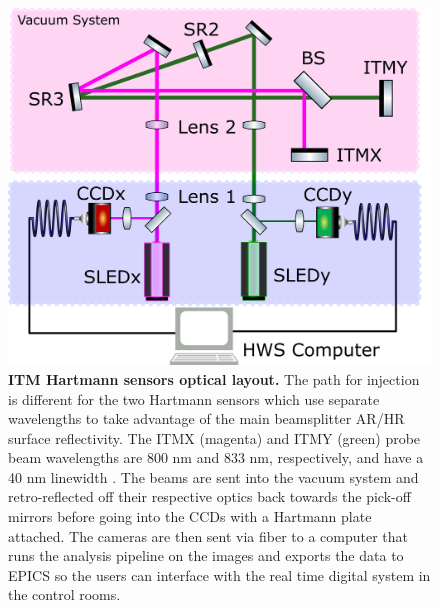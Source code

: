 	\begin{figure}[!]
		\centering
		\includegraphics[width=0.6\textheight]{../Figures/HWS_OpticalLayout.png}
		\caption[ITM Hartmann sensors optical layout.] 
		{\textbf{ITM Hartmann sensors optical layout.} The path for injection is different for the two Hartmann sensors which use separate wavelengths to take advantage of the main beamsplitter AR/HR surface reflectivity. The ITMX (magenta) and ITMY (green) probe beam wavelengths are 800 nm and 833 nm, respectively, and have a 40 nm linewidth \cite{AWC_current}. The beams are sent into the vacuum system and retro-reflected off their respective optics back towards the pick-off mirrors before going into the CCDs with a Hartmann plate attached.  The cameras are then sent via fiber to a computer that runs the analysis pipeline on the images and exports the data to EPICS so the users can interface with the real time digital system in the control rooms.}
		\label{fig:HWS_optical}
	\end{figure}

